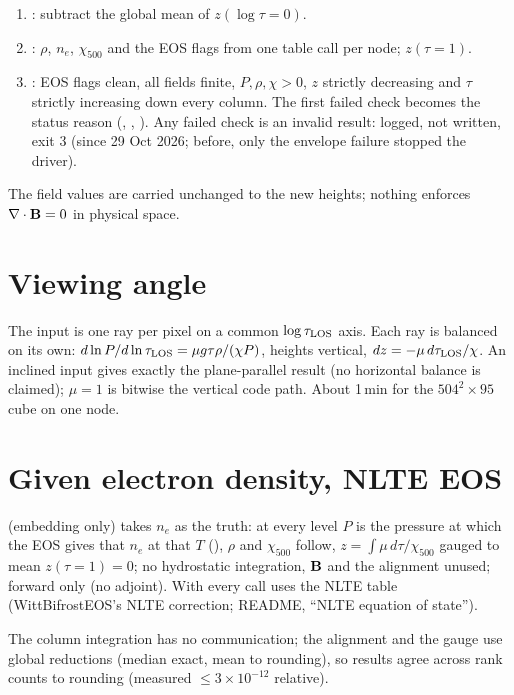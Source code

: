 \begin{enumerate}
applied to the total pressure, an approximation. The column is shifted by that height. The tension is ignored.
\item {}: subtract the global mean of $z(\log\tau=0)$.
\item {}: $\rho$, $n_e$, $\chi_{500}$ and the EOS flags from one table call per node; $z(\tau{=}1)$.
\item {}: EOS flags clean, all fields finite, $P,\rho,\chi>0$, $z$ strictly decreasing and $\tau$ strictly
increasing down every column. The first failed check becomes the status reason (, ,
). Any failed check is an invalid result: logged, not written, exit 3 (since 29 Oct 2026; before, only the
envelope failure stopped the driver).
\end{enumerate}
The field values are carried unchanged to the new heights; nothing enforces $\nabla\cdot\mathbf B=0$ in physical space.

\section{Viewing angle}
The input is one ray per pixel on a common $\log\tau_{\rm LOS}$ axis. Each ray is balanced on its own:
$d\ln P/d\ln\tau_{\rm LOS}=\mu g\tau\rho/(\chi P)$, heights vertical, $dz=-\mu\,d\tau_{\rm LOS}/\chi$. An inclined input gives
exactly the plane-parallel result (no horizontal balance is claimed); $\mu=1$ is bitwise the vertical code path. About 1\,min for
the $504^2\times95$ cube on one node.

\section{Given electron density, NLTE EOS}
 (embedding only) takes $n_e$ as the truth: at every level $P$ is the pressure at
which the EOS gives that $n_e$ at that $T$ (), $\rho$ and $\chi_{500}$ follow, $z=\int\mu\,d\tau/\chi_{500}$
gauged to mean $z(\tau{=}1)=0$; no hydrostatic integration, $\mathbf B$ and the alignment unused; forward only (no adjoint). With
 every call uses the NLTE table (WittBifrostEOS's NLTE correction; README, ``NLTE equation of state'').



The column integration has no communication; the alignment and the gauge use global reductions (median exact, mean to
rounding), so results agree across rank counts to rounding (measured $\le3\times10^{-12}$ relative).

